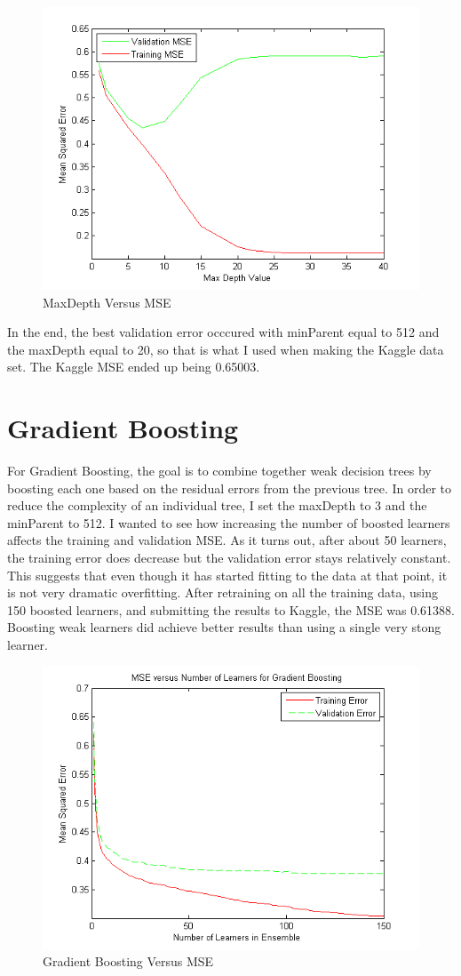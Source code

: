\documentclass[twoside,11pt]{article}
\theoremstyle{definition}
\begin{document}
\begin{figure}[h]
\centering
\includegraphics[width=4 in]{maxDepthVersusMSE2.png}
\caption{MaxDepth Versus MSE}
\end{figure}

In the end, the best validation error occcured with minParent equal to 512 and the maxDepth equal to 20, so that is what I used when making the Kaggle data set. The Kaggle MSE ended up being 0.65003. 

\section*{Gradient Boosting}

For Gradient Boosting, the goal is to combine together weak decision trees by boosting each one based on the residual errors from the previous tree. In order to reduce the complexity of an individual tree, I set the maxDepth to 3 and the minParent to 512. I wanted to see how increasing the number of boosted learners affects the training and validation MSE. As it turns out, after about 50 learners, the training error does decrease but the validation error stays relatively constant. This suggests that even though it has started fitting to the data at that point, it is not very dramatic overfitting. After retraining on all the training data, using 150 boosted learners, and submitting the results to Kaggle, the MSE was 0.61388. Boosting weak learners did achieve better results than using a single very stong learner. \\
\begin{figure}[h!]
\centering
\includegraphics[width=4 in]{numGradBoostsVersusMSE.png}
\caption{Gradient Boosting Versus MSE}
\end{figure}
\end{document}
